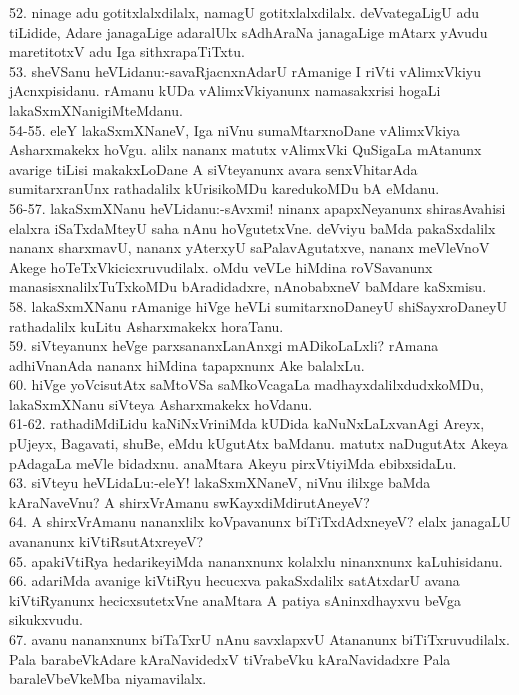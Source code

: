 \documentclass{article}
\begin{document}
52. ninage adu gotitxlalxdilalx, namagU gotitxlalxdilalx. deVvategaLigU adu tiLidide, Adare janagaLige adaralUlx sAdhAraNa janagaLige mAtarx yAvudu maretitotxV adu Iga sithxrapaTiTxtu.\\
53. sheVSanu heVLidanu:-savaRjacnxnAdarU rAmanige I riVti vAlimxVkiyu jAcnxpisidanu. rAmanu kUDa vAlimxVkiyanunx namasakxrisi hogaLi lakaSxmXNanigiMteMdanu.\\
54-55. eleY lakaSxmXNaneV, Iga niVnu sumaMtarxnoDane vAlimxVkiya Asharxmakekx hoVgu. alilx nananx matutx vAlimxVki QuSigaLa mAtanunx avarige tiLisi makakxLoDane A siVteyanunx avara senxVhitarAda sumitarxranUnx rathadalilx kUrisikoMDu karedukoMDu bA eMdanu.\\
56-57. lakaSxmXNanu heVLidanu:-sAvxmi! ninanx apapxNeyanunx shirasAvahisi elalxra iSaTxdaMteyU saha nAnu hoVgutetxVne. deVviyu baMda pakaSxdalilx nananx sharxmavU, nananx yAterxyU saPalavAgutatxve, nananx meVleVnoV Akege hoTeTxVkicicxruvudilalx. oMdu veVLe hiMdina roVSavanunx manasisxnalilxTuTxkoMDu bAradidadxre, nAnobabxneV baMdare kaSxmisu.\\
58. lakaSxmXNanu rAmanige hiVge heVLi sumitarxnoDaneyU shiSayxroDaneyU rathadalilx kuLitu Asharxmakekx horaTanu.\\
59. siVteyanunx heVge parxsananxLanAnxgi mADikoLaLxli? rAmana adhiVnanAda nananx hiMdina tapapxnunx Ake balalxLu.\\
60. hiVge yoVcisutAtx saMtoVSa saMkoVcagaLa madhayxdalilxdudxkoMDu, lakaSxmXNanu siVteya Asharxmakekx hoVdanu.\\
61-62. rathadiMdiLidu kaNiNxVriniMda kUDida kaNuNxLaLxvanAgi Areyx, pUjeyx, Bagavati, shuBe, eMdu kUgutAtx baMdanu. matutx naDugutAtx Akeya pAdagaLa meVle bidadxnu. anaMtara Akeyu pirxVtiyiMda ebibxsidaLu.\\
63. siVteyu heVLidaLu:-eleY! lakaSxmXNaneV, niVnu ililxge baMda kAraNaveVnu? A shirxVrAmanu swKayxdiMdirutAneyeV?\\
64. A shirxVrAmanu nananxlilx koVpavanunx biTiTxdAdxneyeV? elalx janagaLU avananunx kiVtiRsutAtxreyeV?\\
65. apakiVtiRya hedarikeyiMda nananxnunx kolalxlu ninanxnunx kaLuhisidanu.\\
66. adariMda avanige kiVtiRyu hecucxva pakaSxdalilx satAtxdarU avana kiVtiRyanunx hecicxsutetxVne anaMtara A patiya sAninxdhayxvu beVga sikukxvudu.\\
67. avanu nananxnunx biTaTxrU nAnu savxlapxvU Atananunx biTiTxruvudilalx. Pala barabeVkAdare kAraNavidedxV tiVrabeVku kAraNavidadxre Pala baraleVbeVkeMba niyamavilalx.\\
\end{document}
